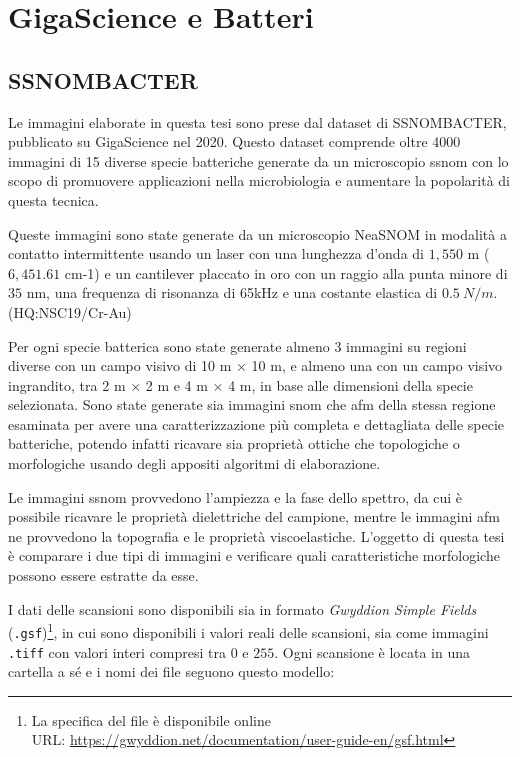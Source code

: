 \documentclass[../main.tex]{subfiles}
\begin{document}
\chapter{GigaScience e Batteri}

\section{SSNOMBACTER}

Le immagini elaborate in questa tesi sono prese dal dataset di SSNOMBACTER, pubblicato su GigaScience nel 2020. Questo dataset comprende oltre 4000 immagini di 15 diverse specie batteriche generate da un microscopio \acrshort{ssnom} con lo scopo di promuovere applicazioni nella \Gls{microbiologia} e aumentare la popolarità di questa tecnica.\cite{ssnombacter}

Queste immagini sono state generate da un microscopio NeaSNOM in modalità a contatto intermittente usando un laser con una lunghezza d'onda di $1,550$ \micro m ($6,451.61$ \gls{cm-1}) e un cantilever placcato in oro con un raggio alla punta minore di $35$ nm, una frequenza di risonanza di 65kHz e una costante elastica di $0.5\ N/m$. (HQ:NSC19/Cr-Au)\cite{micromasch}

Per ogni specie batterica sono state generate almeno 3 immagini su regioni diverse con un campo visivo di 10 \micro m × 10 \micro m, e almeno una con un campo visivo ingrandito, tra 2 \micro m × 2 \micro m e 4 \micro m × 4 \micro m, in base alle dimensioni della specie selezionata. Sono state generate sia immagini \acrshort{snom} che \acrshort{afm} della stessa regione esaminata per avere una caratterizzazione più completa e dettagliata delle specie batteriche, potendo infatti ricavare sia proprietà ottiche che topologiche o morfologiche usando degli appositi algoritmi di elaborazione. 

Le immagini \acrshort{ssnom} provvedono l'ampiezza e la fase dello spettro, da cui è possibile ricavare le proprietà dielettriche del campione, mentre le immagini \acrshort{afm} ne provvedono la topografia e le proprietà viscoelastiche. L'oggetto di questa tesi è comparare i due tipi di immagini e verificare quali caratteristiche morfologiche possono essere estratte da esse.

I dati delle scansioni sono disponibili sia in formato \textit{Gwyddion Simple Fields}\cite{gwyddion} (\texttt{.gsf})\footnote{La specifica del file è disponibile online\\URL: \url{https://gwyddion.net/documentation/user-guide-en/gsf.html}}, in cui sono disponibili i valori reali delle scansioni, sia come immagini \texttt{.tiff} con valori interi compresi tra $0$ e $255$. Ogni scansione è locata in una cartella a sé e i nomi dei file seguono questo modello:
\end{document}
